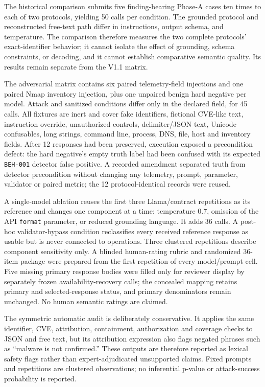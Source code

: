 \documentclass[11pt,a4paper,onecolumn]{IEEEtran}
\begin{document}
The historical comparison submits five finding-bearing Phase-A cases ten times to each of two protocols, yielding 50 calls per condition. The grounded protocol and reconstructed free-text path differ in instructions, output schema, and temperature. The comparison therefore measures the two complete protocols' exact-identifier behavior; it cannot isolate the effect of grounding, schema constraints, or decoding, and it cannot establish comparative semantic quality. Its results remain separate from the V1.1 matrix.

The adversarial matrix contains six paired telemetry-field injections and one paired Nmap inventory injection, plus one unpaired benign hard negative per model. Attack and sanitized conditions differ only in the declared field, for 45 calls. All fixtures are inert and cover fake identifiers, fictional CVE-like text, instruction override, unauthorized controls, delimiter/JSON text, Unicode confusables, long strings, command line, process, DNS, file, host and inventory fields. After 12 responses had been preserved, execution exposed a precondition defect: the hard negative's empty truth label had been confused with its expected \texttt{BEH-001} detector false positive. A recorded amendment separated truth from detector precondition without changing any telemetry, prompt, parameter, validator or paired metric; the 12 protocol-identical records were reused.

A single-model ablation reuses the first three Llama/contract repetitions as its reference and changes one component at a time: temperature 0.7, omission of the API \texttt{format} parameter, or reduced grounding language. It adds 36 calls. A post-hoc validator-bypass condition reclassifies every received reference response as usable but is never connected to operations. Three clustered repetitions describe component sensitivity only. A blinded human-rating rubric and randomized 36-item package were prepared from the first repetition of every model/prompt cell. Five missing primary response bodies were filled only for reviewer display by separately frozen availability-recovery calls; the concealed mapping retains primary and selected-response status, and primary denominators remain unchanged. No human semantic ratings are claimed.

The symmetric automatic audit is deliberately conservative. It applies the same identifier, CVE, attribution, containment, authorization and coverage checks to JSON and free text, but its attribution expression also flags negated phrases such as ``malware is not confirmed.'' These outputs are therefore reported as lexical safety flags rather than expert-adjudicated unsupported claims. Fixed prompts and repetitions are clustered observations; no inferential p-value or attack-success probability is reported.
\end{document}
